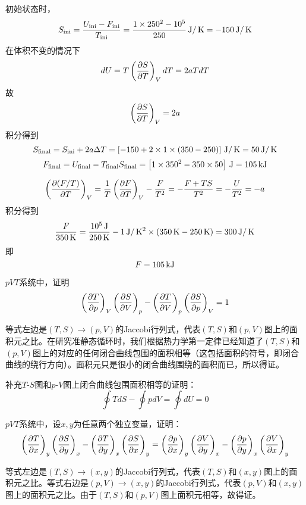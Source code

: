 \documentclass[CJK]{beamer}
\begin{document}
\begin{frame}
  \bch
  初始状态时，
  $$ S_{\rm ini} = \frac{U_{\rm ini}-F_{\rm ini}}{T_{\rm ini}} = \frac{1\times 250^2 - 10^5}{250} \,\mathrm{J}/\,\mathrm{K} = -150\,\mathrm{J}/\,\mathrm{K}$$
  在体积不变的情况下
  $$ dU = T\left(\frac{\partial S}{\partial T}\right)_{V} dT  =  2aTdT$$
  故
  $$ \left(\frac{\partial S}{\partial T}\right)_{V} = 2a $$
  积分得到
  $$ S_{\rm final}  = S_{\rm ini} + 2a\Delta T =  \left[-150 + 2\times 1\times (350-250) \right] \,\mathrm{J}/\,\mathrm{K} = 50 \,\mathrm{J}/\,\mathrm{K} $$
  $$ F_{\rm final} = U_{\rm final}-T_{\rm final}S_{\rm final} = \left[1\times 350^2 - 350\times 50\right] \,\mathrm{J} = 105\,\mathrm{kJ}$$
  
  \ech
\end{frame}

\begin{frame}
  \bch
  $$\left(\frac{\partial (F/T)}{\partial T}\right)_{V} = \frac{1}{T}\left(\frac{\partial F}{\partial T}\right)_{V} - \frac{F}{T^2} = -\frac{F+TS}{T^2} = -\frac{U}{T^2} = -a $$
  积分得到
  $$\frac{F}{350\,\mathrm{K}} = \frac{10^5\,\mathrm{J}}{250\,\mathrm{K}} - 1\,\mathrm{J}/\,\mathrm{K}^2\times(350\,\mathrm{K} - 250\,\mathrm{K}) = 300 \,\mathrm{J}/\,\mathrm{K}$$
  即
  $$F = 105 \,\mathrm{kJ}$$

  \ech
\end{frame}


\begin{frame}
  \chtitle{\proid (\stwo)}
  \bch
  $pVT$系统中，证明
  $$ \left(\frac{\partial T}{\partial p}\right)_{V} \left(\frac{\partial S}{\partial V}\right)_{p} - \left(\frac{\partial T}{\partial V}\right)_{p} \left(\frac{\partial S}{\partial p}\right)_{V} = 1 $$
  \ech
\end{frame}

\begin{frame}
  \bch
  等式左边是$(T,S)\rightarrow (p, V)$的Jaccobi行列式，代表$(T,S)$和$(p,V)$图上的面积元之比。在研究准静态循环时，我们根据热力学第一定律已经知道了$(T,S)$和$(p,V)$图上的对应的任何闭合曲线包围的面积相等（这包括面积的符号，即闭合曲线的绕行方向）。面积元只是很小的闭合曲线围绕的面积而已，所以得证。

  \skipline

  补充$T$-$S$图和$p$-$V$图上闭合曲线包围面积相等的证明：
$$ \oint TdS - \oint pdV = \oint dU = 0$$
  
  \ech
\end{frame}


\begin{frame}
  \chtitle{\proid  (\sthree)}
  \bch
  $pVT$系统中，设$x, y$为任意两个独立变量，证明：
      {\small $$ \left(\frac{\partial T}{\partial x}\right)_{y} \left(\frac{\partial S}{\partial y}\right)_{x} - \left(\frac{\partial T}{\partial y}\right)_{x} \left(\frac{\partial S}{\partial x}\right)_{y} = \left(\frac{\partial p}{\partial x}\right)_{y} \left(\frac{\partial V}{\partial y}\right)_{x} - \left(\frac{\partial p}{\partial y}\right)_{x} \left(\frac{\partial V}{\partial x}\right)_{y} $$}  
  \ech
\end{frame}


\begin{frame}
  \bch
等式左边是$(T,S)\rightarrow (x, y)$的Jaccobi行列式，代表$(T,S)$和$(x,y)$图上的面积元之比。等式右边是$(p,V)\rightarrow (x, y)$的Jaccobi行列式，代表$(p,V)$和$(x,y)$图上的面积元之比。由于$(T,S)$和$(p,V)$图上面积元相等，故得证。
  \ech
\end{frame}
\end{document}

